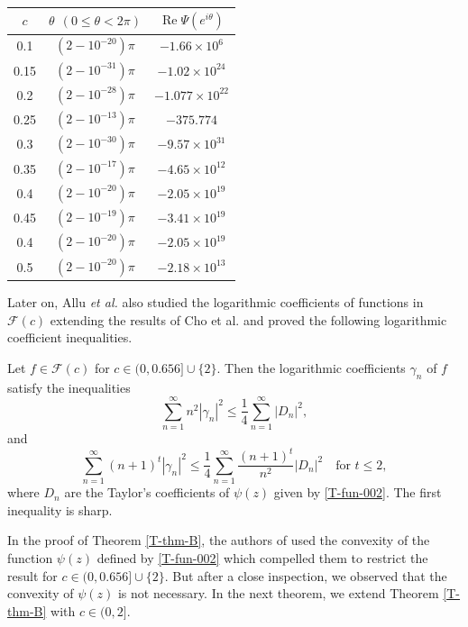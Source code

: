\documentclass[a4paper,12pt]{amsart}
\theoremstyle{definition}
\newenvironment{customthm}[1]
  {\renewcommand\theinnercustomthm{#1}\innercustomthm}
  {\endinnercustomthm}
\newcounter {own}
\begin{document}
\begin{table}[h]
\centering
\caption{} 
\begin{tabular}{|c|c|c|}
\hline
$c$ & $\theta ~~ (0\le \theta<2\pi)$ & $\operatorname{Re}\Psi(e^{i\theta})$ \\[2mm] \hline
0.1 & $(2-10^{-20} )\pi$ & $-1.66\times 10^{6} $ \\[2mm] \hline
0.15 & $(2-10^{-31} )\pi$ & $-1.02\times 10^{24} $ \\[2mm] \hline
0.2 & $(2-10^{-28} )\pi$ &$-1.077\times 10^{22} $  \\[2mm] \hline
0.25 & $(2-10^{-13} )\pi$ & $-375.774 $ \\[2mm] \hline
0.3 & $(2-10^{-30} )\pi$ &$-9.57\times 10^{31} $  \\[2mm] \hline
0.35 & $(2-10^{-17} )\pi$ & $-4.65\times 10^{12} $ \\[2mm] \hline
0.4 & $(2-10^{-20} )\pi$ & $-2.05\times 10^{19} $ \\[2mm] \hline
0.45 & $(2-10^{-19} )\pi$ & $-3.41\times 10^{19} $ \\[2mm] \hline
0.4 & $(2-10^{-20} )\pi$ & $-2.05\times 10^{19} $ \\[2mm] \hline
0.5 & $(2-10^{-20} )\pi$ & $-2.18\times 10^{13} $ \\[2mm] \hline
\end{tabular}
\end{table}


Later on, Allu \emph{et al.} \cite{Allu-Sharma-2024} also studied the logarithmic coefficients of functions in $ \mathcal{F}(c)$ extending the results of Cho et al. \cite{cho-Alimohammadi-2021} and proved the following logarithmic coefficient inequalities.


\begin{customthm}{B}\cite{Allu-Sharma-2024}\label{T-thm-B}
Let \( f \in \mathcal{F}(c) \) for \( c \in (0, 0.656] \cup \{2\} \). Then the logarithmic coefficients \(\gamma_n\) of \( f \) satisfy the inequalities
\[
\sum_{n=1}^{\infty} n^2 |\gamma_n|^2 \leq \frac{1}{4} \sum_{n=1}^{\infty} |D_n|^2,
\]
and
\[
\sum_{n=1}^{\infty} (n+1)^t |\gamma_n|^2 \leq \frac{1}{4} \sum_{n=1}^{\infty} \frac{(n+1)^t}{n^2} |D_n|^2 \quad \text{for } t \leq 2,
\]
where $D_n$ are the Taylor's coefficients of $\psi(z)$ given by \eqref{T-fun-002}. The first inequality is sharp.
\end{customthm}


In the proof of Theorem \ref{T-thm-B}, the authors of \cite{Allu-Sharma-2024} used the convexity of the function $\psi(z)$ defined by \eqref{T-fun-002} which compelled them to restrict the result for \( c \in (0, 0.656] \cup \{2\} \). But after a close inspection, we observed that the convexity of $\psi(z)$ is not necessary.
In the next theorem, we extend Theorem \ref{T-thm-B} with $c \in (0,2]$.
 
\end{document}
